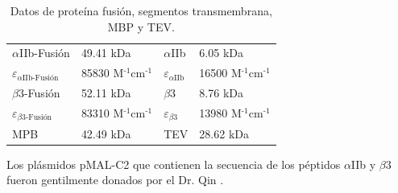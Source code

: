 \begin{appendix}
\begin{table}[H]
  \begin{center}
  \centering
  \captionsetup{justification=centering}  %
    \caption{Datos de proteína fusión, segmentos transmembrana, MBP y TEV.}
    \label{tab:dat_proteina}
    \begin{tabular}{l l| l l }
      \toprule %

		$\alpha$IIb-Fusión & 49.41 kDa 	& $\alpha$IIb 	& 6.05 kDa \\ 
		{\Large{$\varepsilon$}}$_{\alpha \text{IIb-Fusión}}$ & 85830 M$^{\text{-1}}$cm$^{\text{-1}}$ & {\Large{$\varepsilon$}}$_{\alpha \text{IIb}}$ & 16500 M$^{\text{-1}}$cm$^{\text{-1}}$ \\
		$\beta$3-Fusión 	& 52.11 kDa 	& $\beta$3 	& 8.76 kDa \\
		{\Large{$\varepsilon$}}$_{\beta \text{3-Fusión}}$ & 83310 M$^{\text{-1}}$cm$^{\text{-1}}$ & {\Large{$\varepsilon$}}$_{\beta \text{3}}$ & 13980 M$^{\text{-1}}$cm$^{\text{-1}}$ \\
      \midrule %
      MPB & 42.49 kDa 	& TEV 	& 28.62 kDa \\ 
      \bottomrule %
    \end{tabular}
  \end{center}
\end{table}

Los plásmidos pMAL-C2 que contienen la secuencia de los péptidos $\alpha$IIb y $\beta$3 fueron gentilmente donados por el Dr. Qin \citep{Yang2009}. 



\end{appendix}
